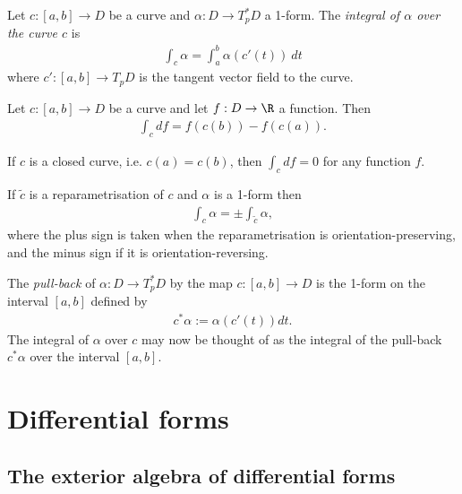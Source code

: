 \documentclass{article}
\begin{document}
\begin{definition}
    Let $c:[a,b]\to D$ be a curve and $\alpha:D\to T_p^*D$ a 1-form. The \emph{integral
    of $\alpha$ over the curve $c$} is 
    \begin{align*}
        \int_c \alpha = \int_a^b \alpha(c'(t))\:dt
    \end{align*}
    where $c':[a,b]\to T_pD$ is the tangent vector field to the curve.
\end{definition}

\begin{proposition}[Notes 4.22]
    Let $c:[a,b]\to D$ be a curve and let $f:D\to\R$ a function. Then
    \begin{align*}
        \int_c df = f(c(b)) - f(c(a)).
    \end{align*}
\end{proposition}

\begin{corollary}
    If $c$ is a closed curve, i.e. $c(a)=c(b)$, then $\int_c df = 0$ for any function $f$.
\end{corollary}

\begin{proposition}
    If $\tilde c$ is a reparametrisation of $c$ and $\alpha$ is a 1-form then 
    \begin{align*}
        \int_c \alpha = \pm \int_{\tilde c} \alpha,
    \end{align*}
    where the plus sign is taken when the reparametrisation is orientation-preserving,
    and the minus sign if it is orientation-reversing.
\end{proposition}

\begin{definition}
    The \emph{pull-back} of $\alpha:D\to T_p^*D$ by the map $c:[a,b]\to D$ is the 1-form on the
    interval $[a,b]$ defined by
    \begin{align*}
        c^*\alpha :=  \alpha(c'(t))dt.
    \end{align*}
    The integral of $\alpha$ over $c$ may now be thought of as the integral of the pull-back 
    $c^*\alpha$ over the interval $[a,b]$.
\end{definition}

\section{Differential forms}

\subsection{The exterior algebra of differential forms}
\end{document}
